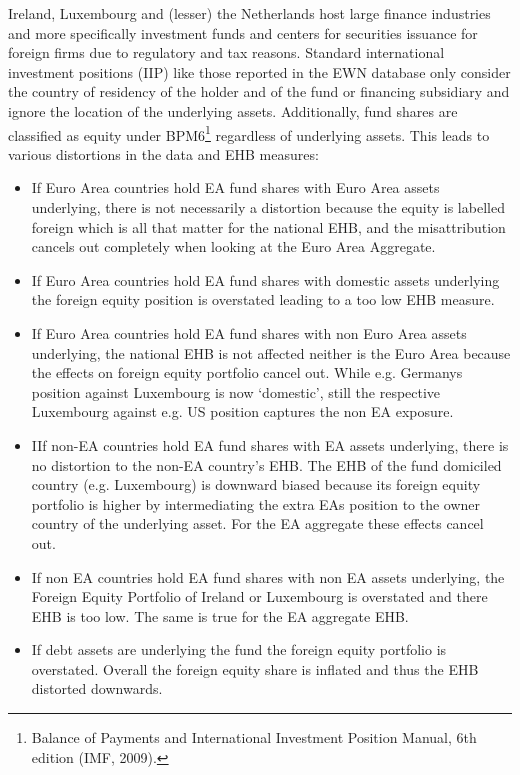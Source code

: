 \documentclass{article}
\begin{document}
Ireland, Luxembourg and (lesser) the Netherlands host large finance industries and more specifically investment funds and centers for securities issuance for foreign firms due to regulatory and tax reasons. Standard international investment positions (IIP) like those reported in the EWN database only consider the country of residency of the holder and of the fund or financing subsidiary and ignore the location of the underlying assets. Additionally, fund shares are classified as equity under BPM6\footnote{Balance of Payments and International Investment Position Manual, 6th edition (IMF, 2009).} regardless of underlying assets. This leads to various distortions in the data and EHB measures: 
\begin{itemize}
\item If Euro Area countries hold EA fund shares with Euro Area assets underlying, there is not necessarily a distortion because the equity is labelled foreign which is all that matter for the national EHB, and the misattribution cancels out completely when looking at the Euro Area Aggregate.
\item If Euro Area countries hold EA fund shares with domestic assets underlying the foreign equity position is overstated leading to a too low EHB measure.
\item If Euro Area countries hold EA fund shares with non Euro Area assets underlying, the national EHB is not affected neither is the Euro Area because the effects on foreign equity portfolio cancel out. While e.g. Germanys position against Luxembourg is now `domestic’, still the respective Luxembourg against e.g. US position captures the non EA exposure.
\item IIf non-EA countries hold EA fund shares with EA assets underlying, there is no distortion to the non-EA country's EHB. The EHB of the fund domiciled country (e.g. Luxembourg) is downward biased because its foreign equity portfolio is higher by intermediating the extra EAs position to the owner country of the underlying asset. For the EA aggregate these effects cancel out.
\item If non EA countries hold EA fund shares with non EA assets underlying, the Foreign Equity Portfolio of Ireland or Luxembourg is overstated and there EHB is too low. The same is true for the EA aggregate EHB.
\item If debt assets are underlying the fund the foreign equity portfolio is overstated. Overall the foreign equity share is inflated and thus the EHB distorted downwards.
\end{itemize}
\end{document}
